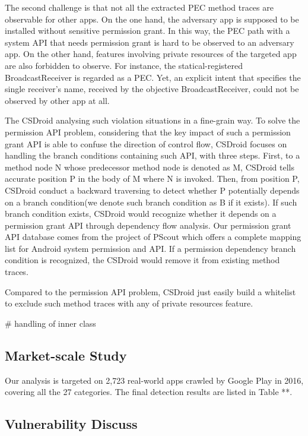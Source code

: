 \documentclass{sig-alternate-05-2015}
\begin{document}
The second challenge is that not all the extracted PEC method traces are observable for other apps.
On the one hand, the adversary app is supposed to be installed without sensitive permission grant. In this way, the PEC path with a system API that needs permission grant is hard to be observed to an adversary app. On the other hand, features involving private resources of the targeted app are also forbidden to observe. For instance, the statical-registered BroadcastReceiver is regarded as a PEC. Yet, an explicit intent that specifies the single receiver's name, received by the objective BroadcastReceiver, could not be observed by other app at all.

The CSDroid analysing such violation situations in a fine-grain way. To solve the permission API problem, considering that the key impact of such a permission grant API is able to confuse the direction of control flow, CSDroid focuses on handling the branch conditions containing such API, with three steps. First, to a method node N whose predecessor method node is denoted as M, CSDroid tells accurate position P in the body of M where N is invoked. Then, from position P, CSDroid conduct a backward traversing to detect whether P potentially depends on a branch condition(we denote such branch condition as B if it exists). If such branch condition exists, CSDroid would recognize whether it depends on a permission grant API through dependency flow analysis. Our permission grant API database comes from the project of PScout\cite{au2012pscout} which offers a complete mapping list for Android system permission and API. If a permission dependency branch condition is recognized, the CSDroid would remove it from existing method traces.

Compared to the permission API problem, CSDroid just easily build a whitelist to exclude such method traces with any of private resources feature.



\# handling of inner class  

\subsection{Market-scale Study}
Our analysis is targeted on 2,723 real-world apps crawled by Google Play in 2016, covering all the 27 categories. The final detection results are listed in Table **.


\subsection{Vulnerability Discuss}
\end{document}
